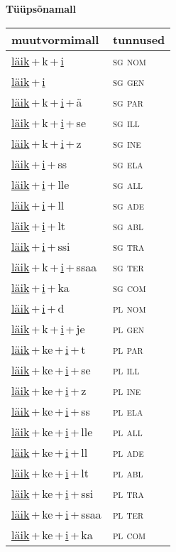 
\vspace{1.8em}
\begin{minipage}{\textwidth}
\textbf{Tüüpsõnamall \,}\\

\begin{sideways}
\begin{tabular}{l l}
muutvormimall & tunnused \\
\hline
\underline{läik}\,+\,k\,+\,\underline{i} & \textsc{ sg nom } \\
\underline{läik}\,+\,\underline{i} & \textsc{ sg gen } \\
\underline{läik}\,+\,k\,+\,\underline{i}\,+\,ä & \textsc{ sg par } \\
\underline{läik}\,+\,k\,+\,\underline{i}\,+\,se & \textsc{ sg ill } \\
\underline{läik}\,+\,k\,+\,\underline{i}\,+\,z & \textsc{ sg ine } \\
\underline{läik}\,+\,\underline{i}\,+\,ss & \textsc{ sg ela } \\
\underline{läik}\,+\,\underline{i}\,+\,lle & \textsc{ sg all } \\
\underline{läik}\,+\,\underline{i}\,+\,ll & \textsc{ sg ade } \\
\underline{läik}\,+\,\underline{i}\,+\,lt & \textsc{ sg abl } \\
\underline{läik}\,+\,\underline{i}\,+\,ssi & \textsc{ sg tra } \\
\underline{läik}\,+\,k\,+\,\underline{i}\,+\,ssaa & \textsc{ sg ter } \\
\underline{läik}\,+\,\underline{i}\,+\,ka & \textsc{ sg com } \\
\underline{läik}\,+\,\underline{i}\,+\,d & \textsc{ pl nom } \\
\underline{läik}\,+\,k\,+\,\underline{i}\,+\,je & \textsc{ pl gen } \\
\underline{läik}\,+\,ke\,+\,\underline{i}\,+\,t & \textsc{ pl par } \\
\underline{läik}\,+\,ke\,+\,\underline{i}\,+\,se & \textsc{ pl ill } \\
\underline{läik}\,+\,ke\,+\,\underline{i}\,+\,z & \textsc{ pl ine } \\
\underline{läik}\,+\,ke\,+\,\underline{i}\,+\,ss & \textsc{ pl ela } \\
\underline{läik}\,+\,ke\,+\,\underline{i}\,+\,lle & \textsc{ pl all } \\
\underline{läik}\,+\,ke\,+\,\underline{i}\,+\,ll & \textsc{ pl ade } \\
\underline{läik}\,+\,ke\,+\,\underline{i}\,+\,lt & \textsc{ pl abl } \\
\underline{läik}\,+\,ke\,+\,\underline{i}\,+\,ssi & \textsc{ pl tra } \\
\underline{läik}\,+\,ke\,+\,\underline{i}\,+\,ssaa & \textsc{ pl ter } \\
\underline{läik}\,+\,ke\,+\,\underline{i}\,+\,ka & \textsc{ pl com } \\
\end{tabular}
\end{sideways}
\label{tab:tüüpsõnamall-läikki}


\end{minipage}
